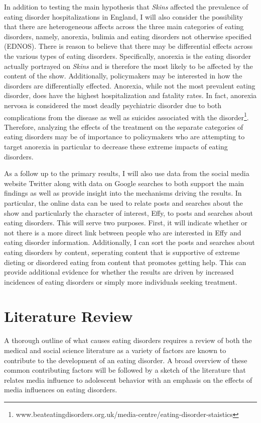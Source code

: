 \documentclass[12pt]{article}
\begin{document}
In addition to testing the main hypothesis that \textit{Skins} affected the prevalence of eating disorder hospitalizations in England, I will also consider the possibility that there are heterogeneous affects across the three main categories of eating disorders, namely, anorexia, bulimia and eating disorders not otherwise specified (EDNOS). There is reason to believe that there may be differential effects across the various types of eating disorders. Specifically, anorexia is the eating disorder actually portrayed on \textit{Skins} and is therefore the most likely to be affected by the content of the show. Additionally, policymakers may be interested in how the disorders are differentially effected. Anorexia, while not the most prevalent eating disorder, does have the highest hospitalization and fatality rates. In fact, anorexia nervosa is considered the most deadly psychiatric disorder due to both complications from the disease as well as suicides associated with the disorder\footnote{www.beateatingdisorders.org.uk/media-centre/eating-disorder-staistics}. Therefore, analyzing the effects of the treatment on the separate categories of eating disorders may be of importance to policymakers who are attempting to target anorexia in particular to decrease these extreme impacts of eating disorders.

As a follow up to the primary results, I will also use data from the social media website Twitter along with data on Google searches to both support the main findings as well as provide insight into the mechanisms driving the results. In particular, the online data can be used to relate posts and searches about the show and particularly the character of interest, Effy, to posts and searches about eating disorders. This will serve two purposes. First, it will indicate whether or not there is a more direct link between people who are interested in Effy and eating disorder information. Additionally, I can sort the posts and searches about eating disorders by content, seperating content that is supportive of extreme dieting or disordered eating from content that promotes getting help. This can provide additional evidence for whether the results are driven by increased incidences of eating disorders or simply more individuals seeking treatment.

\section{Literature Review}

A thorough outline of what causes eating disorders requires a review of both the medical and social science literature as a variety of factors are known to contribute to the development of an eating disorder. A broad overview of these common contributing factors will be followed by a sketch of the literature that relates media influence to adolescent behavior with an emphasis on the effects of media influences on eating disorders.
\end{document}
